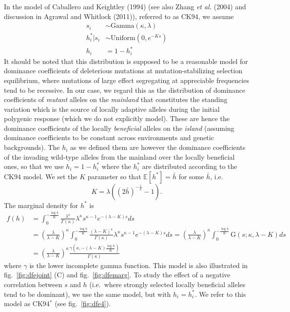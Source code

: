 \documentclass[
  11pt,
]{article}
\begin{document}
In the model of Caballero and Keightley (1994) (see also Zhang \emph{et
al.} (2004) and discussion in Agrawal and Whitlock (2011)), referred to
as CK94, we assume \begin{align*}
    s_i &\sim \mathrm{Gamma}(\kappa, \lambda) \\
    h_i^\ast | s_i &\sim \text{Uniform}(0,e^{-Ks}) \\
    h_i &= 1 - h_i^\ast
\end{align*} It should be noted that this distribution is supposed to be
a reasonable model for dominance coefficients of deleterious mutations
at mutation-stabilizing selection equilibrium, where mutations of large
effect segregating at appreciable frequencies tend to be recessive. In
our case, we regard this as the distribution of dominance coefficients
of \emph{mutant} alleles on the \emph{mainland} that constitutes the
standing variation which is the source of locally adaptive alleles
during the initial polygenic response (which we do not explicitly
model). These are hence the dominance coefficients of the locally
\emph{beneficial} alleles on the \emph{island} (assuming dominance
coefficients to be constant across environments and genetic
backgrounds). The \(h_i\) as we defined them are however the dominance
coefficients of the invading wild-type alleles from the mainland over
the locally beneficial ones, so that we use \(h_i = 1-h_i^\ast\) where
the \(h_i^\ast\) are distributed according to the CK94 model. We set the
\(K\) parameter so that \(\mathbb{E}[h^\ast] = \bar{h}\) for some
\(\bar{h}\), i.e.
\[K =  \lambda \left((2\bar{h})^{-\frac{1}{\kappa}} - 1 \right).\] The
marginal density for \(h^\ast\) is \begin{align*}
  f(h) &= 
  \int_0^{-\frac{\log h}{K}} \frac{\lambda^\kappa}{\Gamma(\kappa)}
    \lambda^\kappa s^{\kappa-1} e^{-(\lambda - K)s} ds \\
    &= \left(\frac{\lambda}{\lambda - K}\right)^\kappa
  \int_0^{-\frac{\log h}{K}} \frac{(\lambda - K)^\kappa}{\Gamma(\kappa)}
    \lambda^\kappa s^{\kappa-1} e^{-(\lambda - K)s} ds 
    = \left(\frac{\lambda}{\lambda - K}\right)^\kappa
  \int_0^{-\frac{\log h}{K}} \mathrm{G}(s;\kappa,\lambda - K)ds \\
    &= \left(\frac{\lambda}{\lambda - K}\right)^\kappa
       \frac{\gamma\left(\kappa, -(\lambda - K) \frac{\log h}{K}\right)}{\Gamma(\kappa)}
\end{align*} where \(\gamma\) is the lower incomplete gamma function.
This model is also illustrated in fig.~\ref{fig:dfejoint} (C) and
fig.~\ref{fig:dfemarg}. To study the effect of a negative correlation
between \(s\) and \(h\) (i.e.~where strongly selected locally beneficial
alleles tend to be dominant), we use the same model, but with
\(h_i = h_i^\ast\). We refer to this model as CK94\(^\ast\) (see
fig.~\ref{fig:dfe4}).
\end{document}
